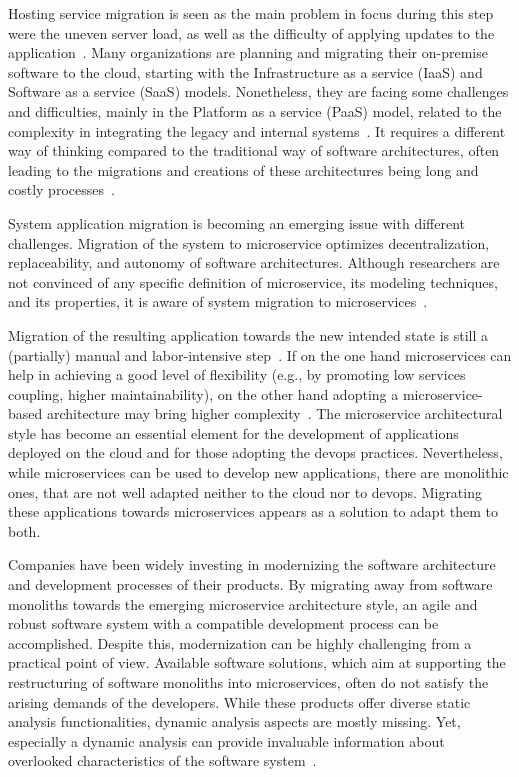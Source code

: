 \par Hosting service migration is seen as the main problem in focus during this step were the uneven server load, as well as the difficulty of applying updates to the application~\cite{Tuuli2020}. Many organizations are planning and migrating their on-premise software to the cloud, starting with the Infrastructure as a service (IaaS) and Software as a service (SaaS) models. Nonetheless, they are facing some challenges and difficulties, mainly in the Platform as a service (PaaS) model, related to the complexity in integrating the legacy and internal systems~\cite{rosa2018}. It requires a different way of thinking compared to the traditional way of software architectures, often leading to the migrations and creations of these architectures being long and costly processes~\cite{leo2019}.
\par System application migration is becoming an emerging issue with different challenges. Migration of the system to microservice optimizes decentralization, replaceability, and autonomy of software architectures. Although researchers are not convinced of any specific definition of microservice, its modeling techniques, and its properties, it is aware of system migration to microservices~\cite{ghayyur2018}.
\par Migration of the resulting application towards the new intended state is still a (partially) manual and labor-intensive step~\cite{overeem2018}. If on the one hand microservices can help in achieving a good level of flexibility (e.g., by promoting low services coupling, higher maintainability), on the other hand adopting a microservice-based architecture may bring higher complexity~\cite{Difrancesco2017}. The microservice architectural style has become an essential element for the development of applications deployed on the cloud and for those adopting the devops practices. Nevertheless, while microservices can be used to develop new applications, there are monolithic ones, that are not well adapted neither to the cloud nor to devops. Migrating these applications towards microservices appears as a solution to adapt them to both. 


\par Companies have been widely investing in modernizing the software architecture and development processes of their products. By migrating away from software monoliths towards the emerging microservice architecture style, an agile and robust software system with a compatible development process can be accomplished. Despite this, modernization can be highly challenging from a practical point of view. Available software solutions, which aim at supporting the restructuring of software monoliths into microservices, often do not satisfy the arising demands of the developers. While these products offer diverse static analysis functionalities, dynamic analysis aspects are mostly missing. Yet, especially a dynamic analysis can provide invaluable information about overlooked characteristics of the software system~\cite{Lenga2019}.

